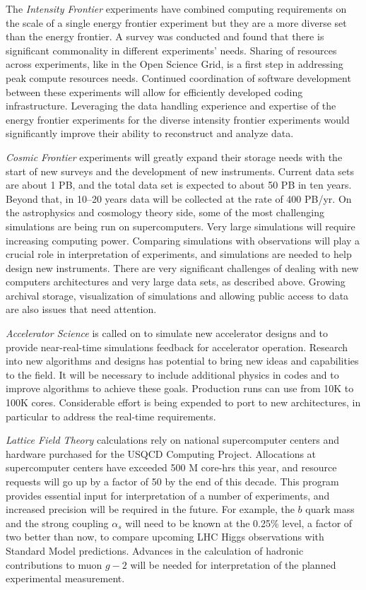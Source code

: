The {\it Intensity Frontier} experiments have combined computing requirements
on the scale of a single energy frontier experiment but they are a more
diverse set than the energy frontier. A survey was conducted and found that
there is significant commonality in different experiments’ needs. Sharing of
resources across experiments, like in the Open Science Grid, is a first step
in addressing peak compute resources needs.  Continued coordination of
software development between these experiments will allow for efficiently
developed coding infrastructure.  Leveraging the data handling experience and
expertise of the energy frontier experiments for the diverse intensity
frontier experiments would significantly improve their ability to reconstruct
and analyze data.

{\it Cosmic Frontier} experiments will greatly expand their storage needs
with the start of new surveys and the development of new instruments.
Current data sets are about 1 PB, and the total data set is expected to
about 50 PB in ten years. Beyond that, in 10--20 years data will be
collected at the rate of 400 PB/yr. On the astrophysics and cosmology
theory side, some of the most challenging simulations are being run on
supercomputers. Very large simulations will require increasing computing
power. Comparing simulations with observations will play a crucial role in
interpretation of experiments, and simulations are needed to help design
new instruments. There are very significant challenges of dealing with new
computers architectures and very large data sets, as described above.
Growing archival storage, visualization of simulations and allowing public
access to data are also issues that need attention.

{\it Accelerator Science} is called on to simulate new accelerator designs
and to provide near-real-time simulations feedback for accelerator
operation. 
Research into new algorithms and designs has potential to bring new ideas and
capabilities to the field.
It will be necessary to include additional physics in codes and
to improve algorithms to achieve these goals. Production runs can use from
10K to 100K cores. Considerable effort is being expended to port to new
architectures, in particular to address the real-time requirements.

{\it Lattice Field Theory} calculations rely on national supercomputer
centers and hardware purchased for the USQCD Computing Project. Allocations
at supercomputer centers have exceeded 500 M core-hrs this year, and
resource requests will go up by a factor of 50 by the end of this decade.
This program provides essential input for interpretation of a number of
experiments, and increased precision will be required in the future. For
example, the $b$ quark mass and the strong coupling $\alpha_s$ will need to
be known at the 0.25\% level, a factor of two better than now, to compare
upcoming LHC Higgs observations with Standard Model predictions. Advances
in the calculation of hadronic contributions to muon $g-2$ will be needed
for interpretation of the planned experimental measurement.

